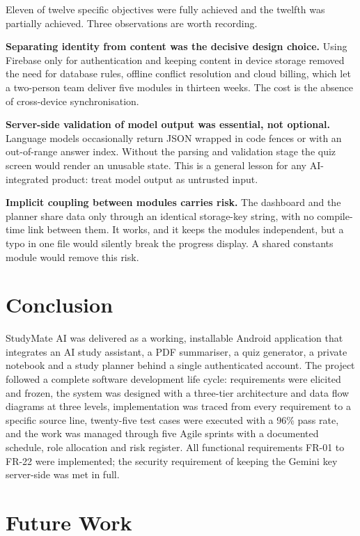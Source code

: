 \documentclass[12pt,a4paper,oneside]{report}
\begin{document}
Eleven of twelve specific objectives were fully achieved and the twelfth was
partially achieved. Three observations are worth recording.

\textbf{Separating identity from content was the decisive design choice.} Using
Firebase only for authentication and keeping content in device storage removed the
need for database rules, offline conflict resolution and cloud billing, which let a
two-person team deliver five modules in thirteen weeks. The cost is the absence of
cross-device synchronisation.

\textbf{Server-side validation of model output was essential, not optional.}
Language models occasionally return JSON wrapped in code fences or with an
out-of-range answer index. Without the parsing and validation stage the quiz screen
would render an unusable state. This is a general lesson for any AI-integrated
product: treat model output as untrusted input.

\textbf{Implicit coupling between modules carries risk.} The dashboard and the
planner share data only through an identical storage-key string, with no compile-time
link between them. It works, and it keeps the modules independent, but a typo in one
file would silently break the progress display. A shared constants module would
remove this risk.

\section{Conclusion}

StudyMate AI was delivered as a working, installable Android application that
integrates an AI study assistant, a PDF summariser, a quiz generator, a private
notebook and a study planner behind a single authenticated account. The project
followed a complete software development life cycle: requirements were elicited and
frozen, the system was designed with a three-tier architecture and data flow
diagrams at three levels, implementation was traced from every requirement to a
specific source line, twenty-five test cases were executed with a 96\% pass rate, and
the work was managed through five Agile sprints with a documented schedule, role
allocation and risk register. All functional requirements FR-01 to FR-22 were
implemented; the security requirement of keeping the Gemini key server-side was met
in full.

\section{Future Work}
\end{document}
